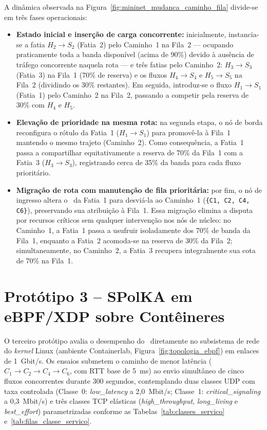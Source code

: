 A dinâmica observada na Figura~\ref{fig:mininet_mudanca_caminho_fila} divide-se em três fases operacionais:
\begin{itemize}
    \item \textbf{Estado inicial e inserção de carga concorrente:} inicialmente, instancia-se a fatia $H_2 \rightarrow S_2$ (Fatia~2) pelo Caminho~1 na Fila~2 --- ocupando praticamente toda a banda disponível (acima de 90\%) devido à ausência de tráfego concorrente naquela rota --- e três fatias pelo Caminho~2: $H_3 \rightarrow S_3$ (Fatia~3) na Fila~1 (70\% de reserva) e os fluxos $H_4 \rightarrow S_4$ e $H_5 \rightarrow S_5$ na Fila~2 (dividindo os 30\% restantes). Em seguida, introduz-se o fluxo $H_1 \rightarrow S_1$ (Fatia~1) pelo Caminho~2 na Fila~2, passando a competir pela reserva de 30\% com $H_4$ e $H_5$.
    \item \textbf{Elevação de prioridade na mesma rota:} na segunda etapa, o nó de borda reconfigura o rótulo da Fatia~1 ($H_1 \rightarrow S_1$) para promovê-la à Fila~1 mantendo o mesmo trajeto (Caminho~2). Como consequência, a Fatia~1 passa a compartilhar equitativamente a reserva de 70\% da Fila~1 com a Fatia~3 ($H_3 \rightarrow S_3$), registrando cerca de 35\% da banda para cada fluxo prioritário.
    \item \textbf{Migração de rota com manutenção de fila prioritária:} por fim, o nó de ingresso altera o \routeID\ da Fatia~1 para desviá-la ao Caminho~1 (\texttt{\{C1, C2, C4, C6\}}), preservando sua atribuição à Fila~1. Essa migração elimina a disputa por recursos críticos sem qualquer intervenção nos nós de núcleo: no Caminho~1, a Fatia~1 passa a usufruir isoladamente dos 70\% de banda da Fila~1, enquanto a Fatia~2 acomoda-se na reserva de 30\% da Fila~2; simultaneamente, no Caminho~2, a Fatia~3 recupera integralmente sua cota de 70\% na Fila~1.
\end{itemize}

\section{Protótipo 3 -- SPolKA em eBPF/XDP sobre Contêineres}
\label{sec:res_prototipo3}

O terceiro protótipo avalia o desempenho do \nome\ diretamente no subsistema de rede do \textit{kernel} Linux (ambiente Containerlab, Figura~\ref{fig:topologia_ebpf}) em enlaces de 1~Gbit/s. Os ensaios submetem o caminho de menor latência ($C_1 \rightarrow C_2 \rightarrow C_4 \rightarrow C_6$, com RTT base de 5~ms) ao envio simultâneo de cinco fluxos concorrentes durante 300 segundos, contemplando duas classes UDP com taxa controlada (Classe~0: \textit{low\_latency} a 2,0~Mbit/s; Classe~1: \textit{critical\_signaling} a 0,3~Mbit/s) e três classes TCP elásticas (\textit{high\_throughput}, \textit{long\_living} e \textit{best\_effort}) parametrizadas conforme as Tabelas~\ref{tab:classes_servico} e~\ref{tab:filas_classe_servico}.

